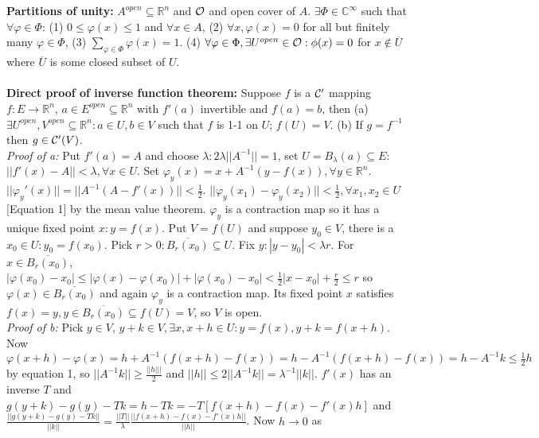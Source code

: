 \\
\\
{\bf Partitions of unity:}
$A^{open} \subseteq {\mathbb R}^n$ and ${\cal O}$ and open cover of $A$.
$\exists \Phi \in {\mathbb C}^{\infty}$ such that $\forall \varphi \in \Phi$: 
(1) $0 \leq \varphi(x) \leq 1$ and $\forall x \in A$,
(2) $\forall x, \varphi(x) = 0$ for all but finitely many $\varphi \in \Phi$,
(3) $\sum_{\varphi \in \Phi} \varphi(x) =1$.
(4) $\forall \varphi \in \Phi, \exists U^{open} \in {\cal O}: \phi(x) = 0$ for $x \notin 
{\overline U}$
where ${\overline U}$ is some closed subset of $U$.
\\
\\
{\bf Direct proof of inverse function theorem:}
Suppose $f$ is a ${\cal C}'$ mapping
$f: E \rightarrow {\mathbb R}^n$, $a \in E^{open} \subseteq {\mathbb R}^n$ with 
$f'(a)$ invertible
and $f(a)=b$, then (a) $\exists U^{open}, V^{open} \subseteq {\mathbb R}^n :
a \in U, b \in V$ such that $f$ is 1-1 on $U$; $f(U)=V$. (b) If $g= f^{-1}$ then
$g \in {\cal C}'(V)$.\\
\emph{Proof of a:}
Put $f'(a)=A$ and choose $\lambda: 2 \lambda ||A^{-1}||=1$, 
set $U= B_{\lambda}(a) \subseteq E$: $||f'(x)-A|| < \lambda, \forall x \in U$.  Set
$\varphi_y(x)= x+ A^{-1} (y-f(x)), \forall y \in {\mathbb R}^n$.
$||\varphi_{y}'(x) || = || A^{-1} (A-f'(x)) || < {\frac 1 2}$.
$|| \varphi_y(x_1)- \varphi_y(x_2)|| < {\frac 1 2}, \forall x_1, x_2 \in U$ [Equation 1]
by the mean value
theorem.  $\varphi_y$ is a contraction map so it has a unique fixed point $x: y=f(x)$.
Put $V=f(U)$ and suppose $y_0 \in V$, there is a $x_0 \in U: y_0=f(x_0)$.  Pick
$r>0: {\overline {B_r(x_0)}} \subseteq U$.
Fix $y: |y-y_0|<\lambda r$.  For 
$x \in {\overline {B_r(x_0)}}$,
$| \varphi(x_0) - x_0 | \le 
|\varphi(x)-\varphi(x_0)| +
|\varphi(x_0)-x_0|< {\frac 1 2} |x-x_0| + {\frac r 2} \le r$ so $\varphi(x) \in
{\overline {B_r(x_0)}}$ and again
$\varphi_y$ is a contraction map.  Its fixed point $x$ satisfies
$f(x)=y, y \in 
{\overline {B_r(x_0)}} 
\subseteq f(U)=V$, so $V$ is open.
\\
\emph{Proof of b:}
Pick $y \in V$, $y+k \in V, \exists x, x+h \in U:
y=f(x), y+k= f(x + h)$.  Now $\varphi(x+h) - \varphi(x) = h + A^{-1}(f(x+h)-f(x)) =
h- A^{-1}(f(x+h)-f(x))= h- A^{-1}k \le {\frac 1 2} h$ by equation 1, so
$||A^{-1}k|| \ge {\frac {||h|||} 2}$ and 
$ ||h|| \le 2 ||A^{-1} k||= \lambda^{-1} ||k||$.  $f'(x)$ has an inverse $T$ and
$g(y+k)-g(y)-Tk=h-Tk= -T[f(x+h)-f(x) -f'(x)h]$ and
${\frac {||g(y+k)-g(y)-Tk||} {||k||}} ={\frac {||T||} {\lambda}} 
{\frac {||f(x+h)-f(x) -f'(x)h||} {||h||}}$. Now $h \rightarrow 0$ as 
